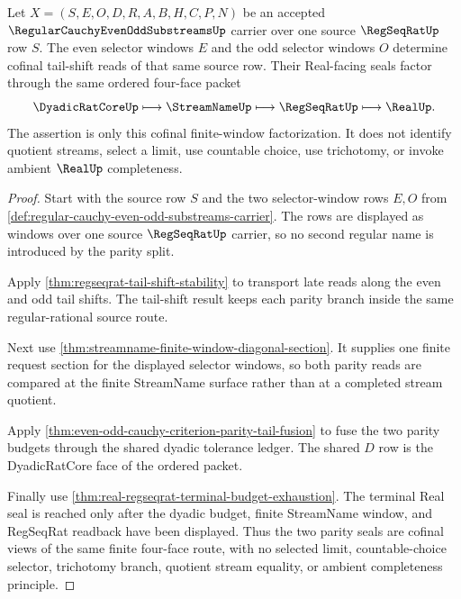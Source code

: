 \begin{theorem}
\label{thm:regular-cauchy-parity-cofinality}
Let $X=(S,E,O,D,R,A,B,H,C,P,N)$ be an accepted $\RegularCauchyEvenOddSubstreamsUp$ carrier over one source $\RegSeqRatUp$ row $S$. The even selector windows $E$ and the odd selector windows $O$ determine cofinal tail-shift reads of that same source row. Their Real-facing seals factor through the same ordered four-face packet
$$
\DyadicRatCoreUp \longmapsto \StreamNameUp \longmapsto \RegSeqRatUp \longmapsto \RealUp .
$$
The assertion is only this cofinal finite-window factorization. It does not identify quotient streams, select a limit, use countable choice, use trichotomy, or invoke ambient $\RealUp$ completeness.
\end{theorem}
\begin{proof}
Start with the source row $S$ and the two selector-window rows $E,O$ from \autoref{def:regular-cauchy-even-odd-substreams-carrier}. The rows are displayed as windows over one source $\RegSeqRatUp$ carrier, so no second regular name is introduced by the parity split.

Apply \autoref{thm:regseqrat-tail-shift-stability} to transport late reads along the even and odd tail shifts. The tail-shift result keeps each parity branch inside the same regular-rational source route.

Next use \autoref{thm:streamname-finite-window-diagonal-section}. It supplies one finite request section for the displayed selector windows, so both parity reads are compared at the finite StreamName surface rather than at a completed stream quotient.

Apply \autoref{thm:even-odd-cauchy-criterion-parity-tail-fusion} to fuse the two parity budgets through the shared dyadic tolerance ledger. The shared $D$ row is the DyadicRatCore face of the ordered packet.

Finally use \autoref{thm:real-regseqrat-terminal-budget-exhaustion}. The terminal Real seal is reached only after the dyadic budget, finite StreamName window, and RegSeqRat readback have been displayed. Thus the two parity seals are cofinal views of the same finite four-face route, with no selected limit, countable-choice selector, trichotomy branch, quotient stream equality, or ambient completeness principle.
\end{proof}


